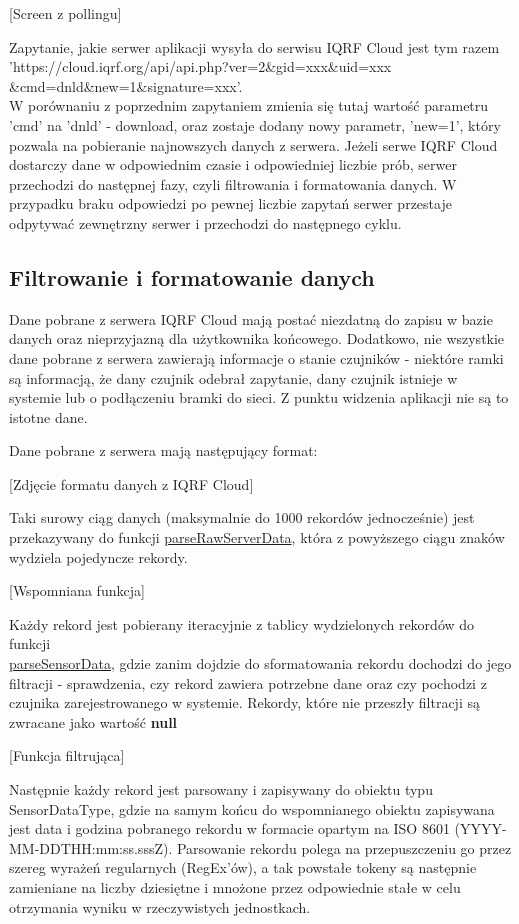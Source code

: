 [Screen z pollingu]

Zapytanie, jakie serwer aplikacji wysyła do serwisu IQRF Cloud jest tym razem \\
'https://cloud.iqrf.org/api/api.php?ver=2\&gid=xxx\&uid=xxx\\\&cmd=dnld\&new=1\&signature=xxx'. \\ W porównaniu z poprzednim zapytaniem zmienia się tutaj wartość parametru
'cmd' na 'dnld' - download, oraz zostaje dodany nowy parametr, 'new=1', który pozwala na pobieranie najnowszych danych z serwera. Jeżeli serwe IQRF Cloud dostarczy dane
w odpowiednim czasie i odpowiedniej liczbie prób, serwer przechodzi do następnej fazy, czyli filtrowania i formatowania danych. W przypadku braku odpowiedzi po
pewnej liczbie zapytań serwer przestaje odpytywać zewnętrzny serwer i przechodzi do następnego cyklu.

\subsection{Filtrowanie i formatowanie danych}
Dane pobrane z serwera IQRF Cloud mają postać niezdatną do zapisu w bazie danych oraz nieprzyjazną dla użytkownika końcowego. Dodatkowo, nie wszystkie dane pobrane z 
serwera zawierają informacje o stanie czujników - niektóre ramki są informacją, że dany czujnik odebrał zapytanie, dany czujnik istnieje w systemie lub o podłączeniu
bramki do sieci. Z punktu widzenia aplikacji nie są to istotne dane.

Dane pobrane z serwera mają następujący format:

[Zdjęcie formatu danych z IQRF Cloud]

Taki surowy ciąg danych (maksymalnie do 1000 rekordów jednocześnie) jest przekazywany do funkcji \underline{parseRawServerData}, która z powyższego ciągu znaków
wydziela pojedyncze rekordy.

[Wspomniana funkcja]

Każdy rekord jest pobierany iteracyjnie z tablicy wydzielonych rekordów do funkcji \\ \underline{parseSensorData}, gdzie zanim dojdzie do sformatowania rekordu 
dochodzi do jego filtracji - sprawdzenia, czy rekord zawiera potrzebne dane oraz czy pochodzi z czujnika zarejestrowanego w systemie. Rekordy, które nie przeszły filtracji 
są zwracane jako wartość \textbf{null}

[Funkcja filtrująca]

Następnie każdy rekord jest parsowany i zapisywany do obiektu typu SensorDataType, gdzie na samym końcu do wspomnianego
obiektu zapisywana jest data i godzina pobranego rekordu w formacie opartym na ISO 8601 (YYYY-MM-DDTHH:mm:ss.sssZ). 
Parsowanie rekordu polega na przepuszczeniu go przez szereg wyrażeń regularnych (RegEx'ów), a tak powstałe tokeny są następnie zamieniane na liczby
dziesiętne i mnożone przez odpowiednie stałe \cite{protronix-comms} w celu otrzymania wyniku w rzeczywistych jednostkach.

